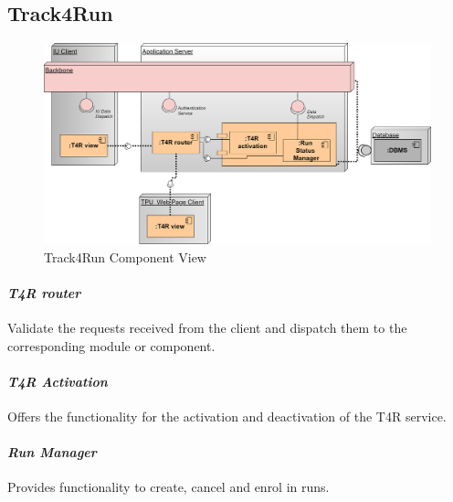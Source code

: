 \subsection{Track4Run}
\label{subsect:T4RComponentView}
\begin{figure}[H]
\caption{Track4Run Component View}
\centering
\includegraphics[width = \textwidth]{sections/architecturalDesign/T4RDiagram.png}
\end{figure}
\paragraph{\textit{T4R router}} Validate the requests received from the client and dispatch them to the corresponding module or component.
\paragraph{\textit{T4R Activation}} Offers the functionality for the activation and deactivation of the T4R service.
\paragraph{\textit{Run Manager}} Provides functionality to create, cancel and enrol in runs.
